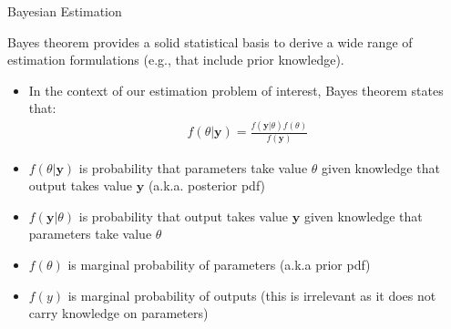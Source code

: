 \documentclass[9pt]{beamer}
\begin{document}
%
\begin{frame}{Bayesian Estimation}

Bayes theorem provides a solid statistical basis to derive a wide range of estimation formulations (e.g., that include prior knowledge). 

\begin{itemize}
\item In the context of our estimation problem of interest, Bayes theorem states that:
\begin{align*}
f(\theta|\mathbf{y})=\frac{f(\mathbf{y}|\theta)f(\theta)}{f(\mathbf{y})}
\end{align*}
\item $f(\theta|\mathbf{y})$ is probability that parameters take value $\theta$ given knowledge that output takes value $\mathbf{y}$ (a.k.a. posterior pdf)
\item $f(\mathbf{y}|\theta)$ is probability that output takes value $\mathbf{y}$ given knowledge that parameters take value $\theta$ 
\item $f(\theta)$ is marginal probability of parameters (a.k.a prior pdf)
\item $f(y)$ is marginal probability of outputs (this is irrelevant as it does not carry knowledge on parameters)
\end{itemize}


\end{frame}
\end{document}
